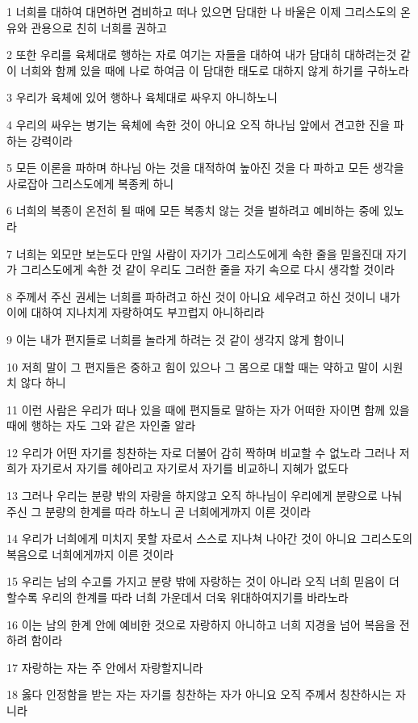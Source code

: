 \par 1 너희를 대하여 대면하면 겸비하고 떠나 있으면 담대한 나 바울은 이제 그리스도의 온유와 관용으로 친히 너희를 권하고
\par 2 또한 우리를 육체대로 행하는 자로 여기는 자들을 대하여 내가 담대히 대하려는것 같이 너희와 함께 있을 때에 나로 하여금 이 담대한 태도로 대하지 않게 하기를 구하노라
\par 3 우리가 육체에 있어 행하나 육체대로 싸우지 아니하노니
\par 4 우리의 싸우는 병기는 육체에 속한 것이 아니요 오직 하나님 앞에서 견고한 진을 파하는 강력이라
\par 5 모든 이론을 파하며 하나님 아는 것을 대적하여 높아진 것을 다 파하고 모든 생각을 사로잡아 그리스도에게 복종케 하니
\par 6 너희의 복종이 온전히 될 때에 모든 복종치 않는 것을 벌하려고 예비하는 중에 있노라
\par 7 너희는 외모만 보는도다 만일 사람이 자기가 그리스도에게 속한 줄을 믿을진대 자기가 그리스도에게 속한 것 같이 우리도 그러한 줄을 자기 속으로 다시 생각할 것이라
\par 8 주께서 주신 권세는 너희를 파하려고 하신 것이 아니요 세우려고 하신 것이니 내가 이에 대하여 지나치게 자랑하여도 부끄럽지 아니하리라
\par 9 이는 내가 편지들로 너희를 놀라게 하려는 것 같이 생각지 않게 함이니
\par 10 저희 말이 그 편지들은 중하고 힘이 있으나 그 몸으로 대할 때는 약하고 말이 시원치 않다 하니
\par 11 이런 사람은 우리가 떠나 있을 때에 편지들로 말하는 자가 어떠한 자이면 함께 있을 때에 행하는 자도 그와 같은 자인줄 알라
\par 12 우리가 어떤 자기를 칭찬하는 자로 더불어 감히 짝하며 비교할 수 없노라 그러나 저희가 자기로서 자기를 헤아리고 자기로서 자기를 비교하니 지혜가 없도다
\par 13 그러나 우리는 분량 밖의 자랑을 하지않고 오직 하나님이 우리에게 분량으로 나눠 주신 그 분량의 한계를 따라 하노니 곧 너희에게까지 이른 것이라
\par 14 우리가 너희에게 미치지 못할 자로서 스스로 지나쳐 나아간 것이 아니요 그리스도의 복음으로 너희에게까지 이른 것이라
\par 15 우리는 남의 수고를 가지고 분량 밖에 자랑하는 것이 아니라 오직 너희 믿음이 더 할수록 우리의 한계를 따라 너희 가운데서 더욱 위대하여지기를 바라노라
\par 16 이는 남의 한계 안에 예비한 것으로 자랑하지 아니하고 너희 지경을 넘어 복음을 전하려 함이라
\par 17 자랑하는 자는 주 안에서 자랑할지니라
\par 18 옳다 인정함을 받는 자는 자기를 칭찬하는 자가 아니요 오직 주께서 칭찬하시는 자니라

